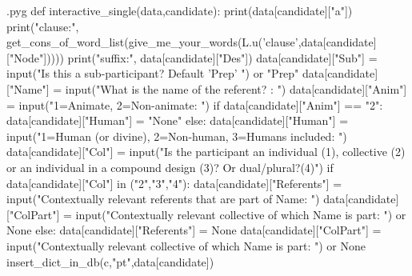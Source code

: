 \documentclass{report}
\makeatletter
\newenvironment{python}{%
  \VerbatimEnvironment
  \minted@resetoptions
  \setkeys{minted@opt}{}
      \begin{VerbatimOut}{\jobname.pyg}}
{%
      \end{VerbatimOut}
      \minted@pygmentize{python}
      \DeleteFile{\jobname.pyg}}
\makeatother
\begin{document}
\begin{python}
def interactive_single(data,candidate):
    print(data[candidate]["a"])
    print("clause:", get_cons_of_word_list(give_me_your_words(L.u('clause',data[candidate]["Node"])))) 
    print("suffix:", data[candidate]["Des"])
    data[candidate]["Sub"] = input("Is this a sub-participant? Default 'Prep' ") or "Prep" 
    data[candidate]["Name"] = input("What is the name of the referent? : ")
    data[candidate]["Anim"] = input("1=Animate, 2=Non-animate: ")
    if data[candidate]["Anim"] == "2":
        data[candidate]["Human"] = "None"
    else:
        data[candidate]["Human"] = input("1=Human (or divine), 2=Non-human, 3=Humans included: ")
    data[candidate]["Col"] = input("Is the participant an individual (1), collective (2) or an individual in a compound design (3)? Or dual/plural?(4)")
    if data[candidate]["Col"] in ("2","3","4"):
        data[candidate]["Referents"] = input("Contextually relevant referents that are part of Name: ")
        data[candidate]["ColPart"] = input("Contextually relevant collective of which Name is part: ") or None
    else:
        data[candidate]["Referents"] = None
        data[candidate]["ColPart"] = input("Contextually relevant collective of which Name is part: ") or None
    insert_dict_in_db(c,"pt",data[candidate])

\end{python}
\end{document}
